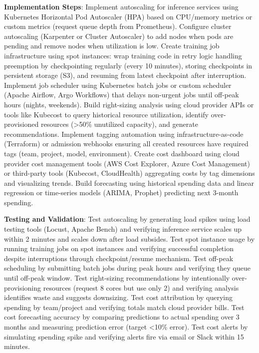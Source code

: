 \textbf{Implementation Steps}: Implement autoscaling for inference services using Kubernetes Horizontal Pod Autoscaler (HPA) based on CPU/memory metrics or custom metrics (request queue depth from Prometheus). Configure cluster autoscaling (Karpenter or Cluster Autoscaler) to add nodes when pods are pending and remove nodes when utilization is low. Create training job infrastructure using spot instances: wrap training code in retry logic handling preemption by checkpointing regularly (every 10 minutes), storing checkpoints in persistent storage (S3), and resuming from latest checkpoint after interruption. Implement job scheduler using Kubernetes batch jobs or custom scheduler (Apache Airflow, Argo Workflows) that delays non-urgent jobs until off-peak hours (nights, weekends). Build right-sizing analysis using cloud provider APIs or tools like Kubecost to query historical resource utilization, identify over-provisioned resources (>50\% unutilized capacity), and generate recommendations. Implement tagging automation using infrastructure-as-code (Terraform) or admission webhooks ensuring all created resources have required tags (team, project, model, environment). Create cost dashboard using cloud provider cost management tools (AWS Cost Explorer, Azure Cost Management) or third-party tools (Kubecost, CloudHealth) aggregating costs by tag dimensions and visualizing trends. Build forecasting using historical spending data and linear regression or time-series models (ARIMA, Prophet) predicting next 3-month spending.

\textbf{Testing and Validation}: Test autoscaling by generating load spikes using load testing tools (Locust, Apache Bench) and verifying inference service scales up within 2 minutes and scales down after load subsides. Test spot instance usage by running training jobs on spot instances and verifying successful completion despite interruptions through checkpoint/resume mechanism. Test off-peak scheduling by submitting batch jobs during peak hours and verifying they queue until off-peak window. Test right-sizing recommendations by intentionally over-provisioning resources (request 8 cores but use only 2) and verifying analysis identifies waste and suggests downsizing. Test cost attribution by querying spending by team/project and verifying totals match cloud provider bills. Test cost forecasting accuracy by comparing predictions to actual spending over 3 months and measuring prediction error (target <10\% error). Test cost alerts by simulating spending spike and verifying alerts fire via email or Slack within 15 minutes.

